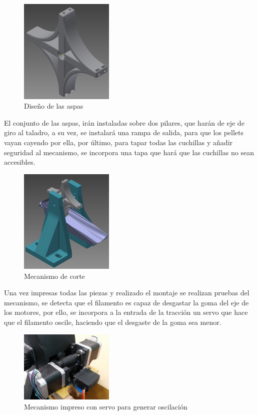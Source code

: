 \begin{figure}[H]
    \centering
    \includegraphics[width=0.4\textwidth]{images/peletizadora/aspas.png}
    \caption{Diseño de las aspas}
    \label{fig:peletizadora_aspas}
\end{figure}

El conjunto de las aspas, irán instaladas sobre dos pilares, que harán de eje de giro al taladro, a su vez, se instalará una rampa de salida, para que los pellets vayan cayendo por ella, por último, para tapar todas las cuchillas y añadir seguridad al mecanismo, se incorpora una tapa que hará que las cuchillas no sean accesibles.

\begin{figure}[H]
    \centering
    \includegraphics[width=0.4\textwidth]{images/peletizadora/corte.png}
    \caption{Mecanismo de corte}
    \label{fig:peletizadora_corte}
\end{figure}

Una vez impresas todas las piezas y realizado el montaje se realizan pruebas del mecanismo, se detecta que el filamento es capaz de desgastar la goma del eje de los motores, por ello, se incorpora a la entrada de la tracción un servo que hace que el filamento oscile, haciendo que el desgaste de la goma sea menor.

\begin{figure}[H]
    \centering
    \includegraphics[width=0.4\textwidth]{images/peletizadora/IMG_20150818_172903.jpg}
    \caption{Mecanismo impreso con servo para generar oscilación}
    \label{fig:peletizadora_mecanismo}
\end{figure}

